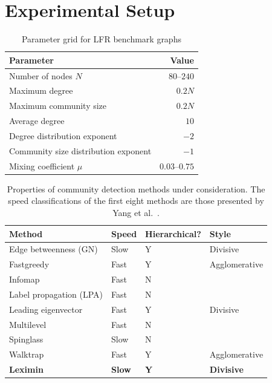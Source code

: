 \section{Experimental Setup}

\begin{table}
	\centering
	\caption{Parameter grid for LFR benchmark graphs}
		\begin{tabular}{l r}
		\toprule
		Parameter & Value \\
		\midrule
		Number of nodes $N$ & $\numrange{80}{240}$ \\
		Maximum degree & $0.2N$ \\
		Maximum community size & $0.2N$ \\
		Average degree & $10$ \\
		Degree distribution exponent & $-2$ \\
		Community size distribution exponent & $-1$ \\
		Mixing coefficient $\mu$ & $\numrange{0.03}{0.75}$ \\
		\bottomrule
		\end{tabular}
	\label{tab:Parameter grid}
\end{table}

\begin{table}
	\centering
	\caption{Properties of community detection methods under consideration. The speed classifications of the first eight methods are those presented by Yang et al.~\cite{yang2016comparative}.}
	\begin{tabular}{l l l l}
	\toprule
	Method & Speed & Hierarchical? & Style \\
	\midrule
	Edge betweenness (GN) & Slow & Y & Divisive \\
	Fastgreedy & Fast & Y & Agglomerative \\
	Infomap & Fast & N \\
	Label propagation (LPA) & Fast & N \\
	Leading eigenvector & Fast & Y & Divisive\\
	Multilevel & Fast & N \\
	Spinglass & Slow & N \\
	Walktrap & Fast & Y & Agglomerative \\
	\textbf{Leximin} & \textbf{Slow} & \textbf{Y} & \textbf{Divisive} \\
	\bottomrule
	\end{tabular}
	
	\label{tab:methods}
\end{table}


